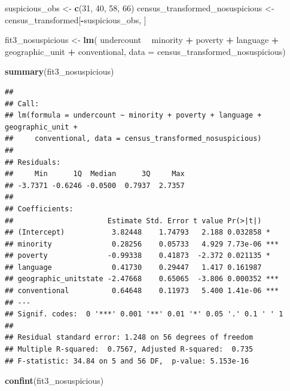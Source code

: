 \documentclass[landscape]{article}
\newenvironment{Shaded}{\begin{snugshade}}{\end{snugshade}}
\newcommand{\KeywordTok}[1]{\textcolor[rgb]{0.13,0.29,0.53}{\textbf{#1}}}
\newcommand{\DataTypeTok}[1]{\textcolor[rgb]{0.13,0.29,0.53}{#1}}
\newcommand{\DecValTok}[1]{\textcolor[rgb]{0.00,0.00,0.81}{#1}}
\newcommand{\StringTok}[1]{\textcolor[rgb]{0.31,0.60,0.02}{#1}}
\newcommand{\OperatorTok}[1]{\textcolor[rgb]{0.81,0.36,0.00}{\textbf{#1}}}
\newcommand{\NormalTok}[1]{#1}
\begin{document}
\begin{Shaded}
\begin{Highlighting}[]
\NormalTok{suspicious_obs <-}\StringTok{ }\KeywordTok{c}\NormalTok{(}\DecValTok{31}\NormalTok{, }\DecValTok{40}\NormalTok{, }\DecValTok{58}\NormalTok{, }\DecValTok{66}\NormalTok{)}
\NormalTok{census_transformed_nosuspicious <-}\StringTok{ }\NormalTok{census_transformed[}\OperatorTok{-}\NormalTok{suspicious_obs, ]}

\NormalTok{fit3_nosuspicious <-}\StringTok{ }\KeywordTok{lm}\NormalTok{(}
\NormalTok{  undercount }\OperatorTok{~}\StringTok{ }\NormalTok{minority }\OperatorTok{+}\StringTok{ }\NormalTok{poverty }\OperatorTok{+}\StringTok{ }\NormalTok{language }\OperatorTok{+}\StringTok{ }\NormalTok{geographic_unit }\OperatorTok{+}\StringTok{ }\NormalTok{conventional,}
  \DataTypeTok{data =}\NormalTok{ census_transformed_nosuspicious)}

\KeywordTok{summary}\NormalTok{(fit3_nosuspicious)}
\end{Highlighting}
\end{Shaded}

\begin{verbatim}
## 
## Call:
## lm(formula = undercount ~ minority + poverty + language + geographic_unit + 
##     conventional, data = census_transformed_nosuspicious)
## 
## Residuals:
##     Min      1Q  Median      3Q     Max 
## -3.7371 -0.6246 -0.0500  0.7937  2.7357 
## 
## Coefficients:
##                      Estimate Std. Error t value Pr(>|t|)    
## (Intercept)           3.82448    1.74793   2.188 0.032858 *  
## minority              0.28256    0.05733   4.929 7.73e-06 ***
## poverty              -0.99338    0.41873  -2.372 0.021135 *  
## language              0.41730    0.29447   1.417 0.161987    
## geographic_unitstate -2.47668    0.65065  -3.806 0.000352 ***
## conventional          0.64648    0.11973   5.400 1.41e-06 ***
## ---
## Signif. codes:  0 '***' 0.001 '**' 0.01 '*' 0.05 '.' 0.1 ' ' 1
## 
## Residual standard error: 1.248 on 56 degrees of freedom
## Multiple R-squared:  0.7567, Adjusted R-squared:  0.735 
## F-statistic: 34.84 on 5 and 56 DF,  p-value: 5.153e-16
\end{verbatim}

\begin{Shaded}
\begin{Highlighting}[]
\KeywordTok{confint}\NormalTok{(fit3_nosuspicious)}
\end{Highlighting}
\end{Shaded}
\end{document}
